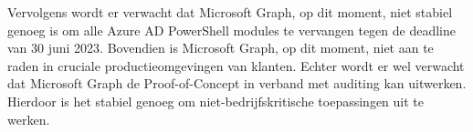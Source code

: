 Vervolgens wordt er verwacht dat Microsoft Graph, op dit moment, niet stabiel genoeg is om alle Azure AD PowerShell modules te vervangen tegen de deadline van 30 juni 2023. Bovendien is Microsoft Graph, op dit moment, niet aan te raden in cruciale productieomgevingen van klanten. Echter wordt er wel verwacht dat Microsoft Graph de Proof-of-Concept in verband met auditing kan uitwerken. Hierdoor is het stabiel genoeg om niet-bedrijfskritische toepassingen uit te werken.


